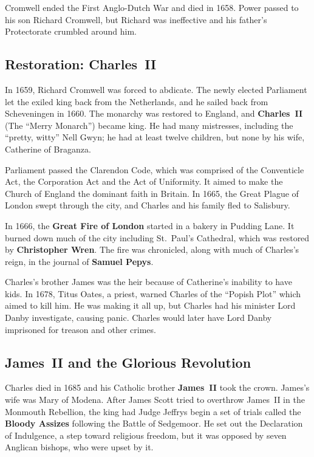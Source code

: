 Cromwell ended the First Anglo-Dutch War and died in 1658.
Power passed to his son Richard Cromwell,
but Richard was ineffective and his father's Protectorate crumbled around him.

\subsection*{Restoration: Charles~II}

In 1659, Richard Cromwell was forced to abdicate.
The newly elected Parliament let the exiled king back from the Netherlands,
and he sailed back from Scheveningen in 1660.
The monarchy was restored to England, and \textbf{Charles~II} (The ``Merry Monarch'') became king.
He had many mistresses, including the ``pretty, witty'' Nell Gwyn;
he had at least twelve children, but none by his wife, Catherine of Braganza.

Parliament passed the Clarendon Code, which was comprised of
the Conventicle Act,
the Corporation Act
and the Act of Uniformity.
It aimed to make the Church of England the dominant faith in Britain.
In 1665, the Great Plague of London swept through the city,
and Charles and his family fled to Salisbury.

In 1666, the \textbf{Great Fire of London} started in a bakery in Pudding Lane.
It burned down much of the city including St.\ Paul's Cathedral,
which was restored by \textbf{Christopher Wren}.
The fire was chronicled, along with much of Charles's reign,
in the journal of \textbf{Samuel Pepys}.

Charles's brother James was the heir because of Catherine's inability to have kids.
In 1678, Titus Oates, a priest, warned Charles of the ``Popish Plot'' which aimed to kill him.
He was making it all up, but Charles had his minister Lord Danby investigate, causing panic.
Charles would later have Lord Danby imprisoned for treason and other crimes.

\subsection*{James~II and the Glorious Revolution}

Charles died in 1685 and his Catholic brother \textbf{James~II} took the crown.
James's wife was Mary of Modena.
After James Scott tried to overthrow James~II in the Monmouth Rebellion,
the king had Judge Jeffrys begin a set of trials called the \textbf{Bloody Assizes}
following the Battle of Sedgemoor.
He set out the Declaration of Indulgence, a step toward religious freedom,
but it was opposed by seven Anglican bishops, who were upset by it.

